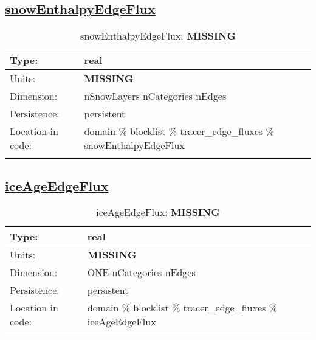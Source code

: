 \subsection[snowEnthalpyEdgeFlux]{\hyperref[sec:var_tab_tracer_edge_fluxes]{snowEnthalpyEdgeFlux}}
\label{subsec:var_sec_tracer_edge_fluxes_snowEnthalpyEdgeFlux}
\begin{center}
\begin{longtable}{| p{2.0in} | p{4.0in} |}
        \hline 
        Type: & real \\
        \hline 
        Units: & {\bf \color{red} MISSING} \\
        \hline 
        Dimension: & nSnowLayers nCategories nEdges \\
        \hline 
        Persistence: & persistent \\
        \hline 
         Location in code: & domain \% blocklist \% tracer\_edge\_fluxes \% snowEnthalpyEdgeFlux \\
         \hline 
    \caption{snowEnthalpyEdgeFlux: {\bf \color{red} MISSING}}
\end{longtable}
\end{center}
\subsection[iceAgeEdgeFlux]{\hyperref[sec:var_tab_tracer_edge_fluxes]{iceAgeEdgeFlux}}
\label{subsec:var_sec_tracer_edge_fluxes_iceAgeEdgeFlux}
\begin{center}
\begin{longtable}{| p{2.0in} | p{4.0in} |}
        \hline 
        Type: & real \\
        \hline 
        Units: & {\bf \color{red} MISSING} \\
        \hline 
        Dimension: & ONE nCategories nEdges \\
        \hline 
        Persistence: & persistent \\
        \hline 
         Location in code: & domain \% blocklist \% tracer\_edge\_fluxes \% iceAgeEdgeFlux \\
         \hline 
    \caption{iceAgeEdgeFlux: {\bf \color{red} MISSING}}
\end{longtable}
\end{center}
